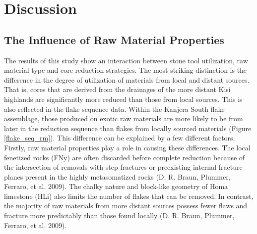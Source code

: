 \documentclass[]{elsarticle} %
\begin{document}
\hypertarget{discussion}{%
\section{Discussion}\label{discussion}}

\hypertarget{the-influence-of-raw-material-properties}{%
\subsection{The Influence of Raw Material
Properties}\label{the-influence-of-raw-material-properties}}

The results of this study show an interaction between stone tool
utilization, raw material type and core reduction strategies. The most
striking distinction is the difference in the degree of utilization of
materials from local and distant sources. That is, cores that are
derived from the drainages of the more distant Kisi highlands are
significantly more reduced than those from local sources. This is also
reflected in the flake sequence data. Within the Kanjera South flake
assemblage, those produced on exotic raw materials are more likely to be
from later in the reduction sequence than flakes from locally sourced
materials (Figure \ref{flake_seq_rm}). This difference can be explained
by a few different factors. Firstly, raw material properties play a role
in causing these differences. The local fenetized rocks (FNy) are often
discarded before complete reduction because of the intersection of
removals with step fractures or preexisting internal fracture planes
present in the highly metasomatized rocks (D. R. Braun, Plummer,
Ferraro, et al. 2009). The chalky nature and block-like geometry of Homa
limestone (HLi) also limits the number of flakes that can be removed. In
contrast, the majority of raw materials from more distant sources
possess fewer flaws and fracture more predictably than those found
locally (D. R. Braun, Plummer, Ferraro, et al. 2009).
\end{document}

